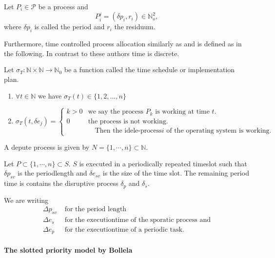 \begin{definition}
Let $P_i\in \mathcal{P}$ be a process and 
\begin{equation}
P^j_i = ( \delta p_i, r_i) \in \mathbb{N}_o^2,  
\end{equation}
where $\delta p_i$ is called the period and $r_i$ the residuum. 
\end{definition}
Furthermore, time controlled process allocation similarly as \cite{B97} and \cite[p. 34]{K} is defined as in the following. In contrast to these authors time is discrete.

\begin{definition}
Let $\sigma_T: \mathbb{N} \times \mathbb{N} \rightarrow \mathbb{N}_0$ be a function called the time schedule or implementation plan.
\begin{enumerate}
\item $\forall t \in \mathbb{N}$ we have $\sigma_T(t)\in \{1,2,...,n\}$
\item \begin{equation}
		\sigma_T(t,\delta e_j) =
		\begin{cases}
			k > 0 & \text{we say the process $P_k$ is working at time $t$.}\\
			0 & \text{the process is not working.}\\
			  &\quad  \text{Then the idele-process$i$ of the operating system is working.}
		\end{cases}       
\end{equation}
\end{enumerate}
\end{definition}

A depute process is given by $ N = \{1, \cdots, n\}\subset \mathbb{N}$. 

Let $P \subset \{1, \cdots, n\} \subset S$.
$S$ is executed in a periodically repeated timeslot such that $\delta p_{sv}$ is the periodlength and $\delta e_{sv}$ is the size of the time slot.
The remaining period time is contains the  disruptive process $\delta_p$ and $\delta_s$.

We are writing
\begin{align}
	\Delta p_{sv} &\text{ for the period length} \\
	\Delta e_s &\text{ for the executiontime of the sporatic process and}\\ 
	\Delta e_p &\text{ for the executiontime of a periodic task.}
\end{align}

\paragraph{The slotted priority model by Bollela}

